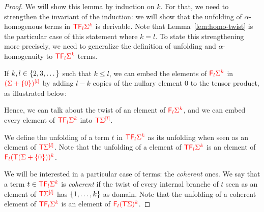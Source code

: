 \begin{proof}
We will show this lemma by induction on $k$. For that, we need to strengthen the invariant of the induction: we will show that the unfolding of $\alpha$-homogenous terms in $\ranked{\tmonad \reduce l\rSigma^k}$ is derivable. Note that Lemma~\ref{lem:homo-twist} is the particular case of this statement where $k=l$. To state this strengthening more precisely, we need to generalize the definition of unfolding and $\alpha$-homogenuity to $\ranked{\tmonad \reduce l\rSigma^k}$ terms.



If $k, l\in \set{2,3,\dots}$ such that $k\leq l$, we can embed the elements of $\ranked{\reduce l \rSigma^k}$ in 
$\ranked{\mati l {(\rSigma+\set{0})}}$ by adding $l-k$ copies of the nullary element $0$ to the tensor product, as illustrated below:
\begin{center}

\end{center}  
Hence, we can talk about the twist of an element of $\ranked{\reduce l \Sigma^k}$, and we can embed every element of $\ranked{\tmonad \reduce l \Sigma^k}$  into $\ranked{\tmonad \mati l \Sigma}$.

We define the unfolding of a term $t$ in $\ranked{\tmonad \reduce l \Sigma^k}$ as its unfolding when seen as an element of $\ranked{\tmonad \mati l \Sigma}$. Note that the unfolding of a element of $\ranked{\tmonad \reduce l \Sigma^k}$ is an element of $\ranked{\reduce l(\tmonad (\Sigma+\set{0}))^k}$.

We will be interested in a particular case of terms: the \emph{coherent} ones. We say that a term $t\in \ranked{\tmonad \reduce l \Sigma^k}$ is \emph{coherent} if the twist of every internal branche of $t$ seen as an element of $\ranked{\tmonad \mati l \Sigma}$ has $\set{1,\ldots,k}$ as domain. Note that the unfolding of a coherent element of $\ranked{\tmonad \reduce l \Sigma^k}$ is an element of $\ranked{\reduce l(\tmonad \Sigma)^k}$.



\end{proof}
